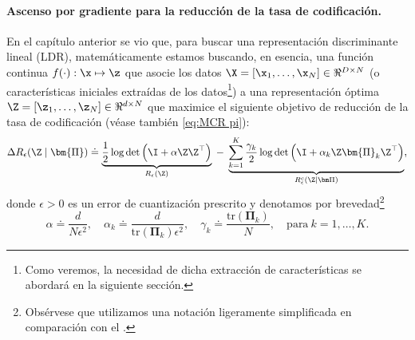 \documentclass[../../book-main.tex]{subfiles}
\begin{document}
\paragraph{Ascenso por gradiente para la reducción de la tasa de codificación.} En el
capítulo anterior se vio que, para buscar una representación discriminante lineal
(LDR), matemáticamente estamos buscando, en esencia, una
función continua $f(\cdot): \x \mapsto \z$ que asocie los datos $\X =
[\x_1, \ldots, \x_N] \in \Re^{D \times N}$ (o características iniciales
    extraídas de los datos\footnote{Como veremos, la necesidad de dicha
extracción de características se abordará en la siguiente sección.}) a una representación óptima
$\Z = [\z_1, \ldots, \z_N] \in \Re^{d \times N}$ que
maximice el siguiente objetivo de reducción de la tasa de codificación (véase también
\eqref{eq:MCR pi}):
\begin{equation}\label{eq:mcr-formulation}
    \scalebox{0.95}{\(\displaystyle\Delta R_{\epsilon}(\Z \mid \bm{\Pi}) \doteq
            \underbrace{\frac{1}{2}\log\det \Big(\I + {\alpha} \Z
            \Z^{\top} \Big)}_{R_{\epsilon}(\Z)} \;-\;
            \underbrace{\sum_{k=1}^{K}\frac{\gamma_{k}}{2}
                \log\det\Big(\I + {\alpha_{k}} \Z \bm{\Pi}_{k} \Z^{\top}
    \Big)}_{R_{\epsilon}^c(\Z \mid \bm \Pi)}\)},
\end{equation}
donde $\epsilon > 0$ es un error de cuantización prescrito y denotamos
por brevedad\footnote{Obsérvese que utilizamos una notación ligeramente simplificada
en comparación con el .}
\begin{equation}
    \alpha \doteq \frac{d}{N\epsilon^2}, \quad \alpha_{k} \doteq
    \frac{d}{\mathrm{tr}(\bm{\Pi}_{k})\epsilon^2}, \quad \gamma_{k}
    \doteq \frac{\mathrm{tr}(\bm{\Pi}_{k})}{N}, \quad \text{para}\ k
    = 1,\ldots, K.
\end{equation}
\end{document}
